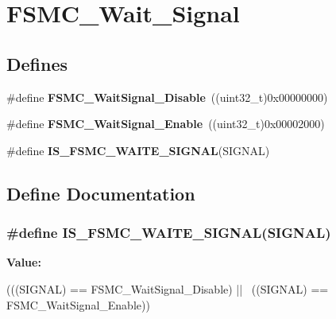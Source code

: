 \hypertarget{group__FSMC__Wait__Signal}{
\section{FSMC\_\-Wait\_\-Signal}
\label{group__FSMC__Wait__Signal}
}
\subsection*{Defines}
\begin{DoxyCompactItemize}
\item 
\hypertarget{group__FSMC__Wait__Signal_ga6ea66c8ddee073281c421533bdff7e19}{
\#define {\bfseries FSMC\_\-WaitSignal\_\-Disable}~((uint32\_\-t)0x00000000)}
\label{group__FSMC__Wait__Signal_ga6ea66c8ddee073281c421533bdff7e19}

\item 
\hypertarget{group__FSMC__Wait__Signal_gaf809e339f1cdc9d0a815fd98712e9ee3}{
\#define {\bfseries FSMC\_\-WaitSignal\_\-Enable}~((uint32\_\-t)0x00002000)}
\label{group__FSMC__Wait__Signal_gaf809e339f1cdc9d0a815fd98712e9ee3}

\item 
\#define {\bfseries IS\_\-FSMC\_\-WAITE\_\-SIGNAL}(SIGNAL)
\end{DoxyCompactItemize}


\subsection{Define Documentation}
\hypertarget{group__FSMC__Wait__Signal_gae617db4f15c82850d4f5c927f9a7db3e}{
\subsubsection[{IS\_\-FSMC\_\-WAITE\_\-SIGNAL}]{\setlength{\rightskip}{0pt plus 5cm}\#define IS\_\-FSMC\_\-WAITE\_\-SIGNAL(SIGNAL)}}
\label{group__FSMC__Wait__Signal_gae617db4f15c82850d4f5c927f9a7db3e}
{\bfseries Value:}
\begin{DoxyCode}
(((SIGNAL) == FSMC_WaitSignal_Disable) || \
                                      ((SIGNAL) == FSMC_WaitSignal_Enable))
\end{DoxyCode}
